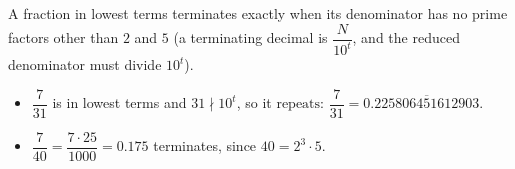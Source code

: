 A fraction in lowest terms terminates exactly when its denominator has no prime factors other than $2$ and $5$ (a terminating decimal is $\dfrac{N}{10^t}$, and the reduced denominator must divide $10^t$).
\begin{itemize}
\item $\dfrac7{31}$ is in lowest terms and $31\nmid10^t$, so it $\boxed{\text{repeats}}$: $\dfrac7{31}=0.\overline{225806451612903}$.
\item $\dfrac7{40}=\dfrac{7\cdot25}{1000}=\boxed{0.175}$ terminates, since $40=2^3\cdot5$.
\end{itemize}
